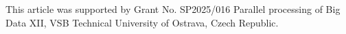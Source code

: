 \documentclass[runningheads]{llncs}
\begin{document}


%
%

\begin{credits}
\subsubsection{\ackname}This article was supported by Grant No. SP2025/016 Parallel processing of Big Data XII, VSB Technical University of Ostrava, Czech Republic.

\end{credits}
%
%
%


%
\end{document}
